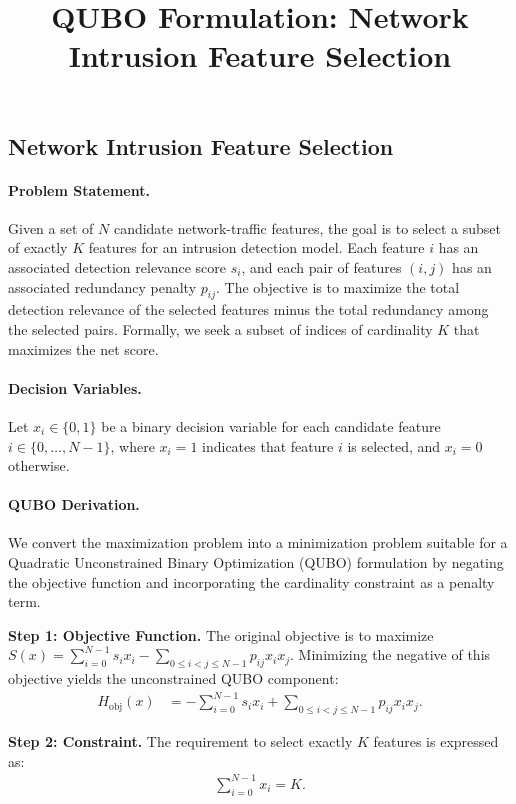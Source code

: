 \documentclass[12pt]{article}
\title{QUBO Formulation: Network Intrusion Feature Selection}
\date{}
\begin{document}
\maketitle

\subsection*{Network Intrusion Feature Selection}

\paragraph{Problem Statement.}
Given a set of $N$ candidate network-traffic features, the goal is to select a subset of exactly $K$ features for an intrusion detection model. Each feature $i$ has an associated detection relevance score $s_i$, and each pair of features $(i,j)$ has an associated redundancy penalty $p_{ij}$. The objective is to maximize the total detection relevance of the selected features minus the total redundancy among the selected pairs. Formally, we seek a subset of indices of cardinality $K$ that maximizes the net score.

\paragraph{Decision Variables.}
Let $x_i \in \{0,1\}$ be a binary decision variable for each candidate feature $i \in \{0, \dots, N-1\}$, where $x_i = 1$ indicates that feature $i$ is selected, and $x_i = 0$ otherwise.

\paragraph{QUBO Derivation.}
We convert the maximization problem into a minimization problem suitable for a Quadratic Unconstrained Binary Optimization (QUBO) formulation by negating the objective function and incorporating the cardinality constraint as a penalty term.

\textbf{Step 1: Objective Function.}
The original objective is to maximize $S(x) = \sum_{i=0}^{N-1} s_i x_i - \sum_{0 \le i < j \le N-1} p_{ij} x_i x_j$.
Minimizing the negative of this objective yields the unconstrained QUBO component:
\begin{align}
    H_{\text{obj}}(x) &= -\sum_{i=0}^{N-1} s_i x_i + \sum_{0 \le i < j \le N-1} p_{ij} x_i x_j.
\end{align}

\textbf{Step 2: Constraint.}
The requirement to select exactly $K$ features is expressed as:
\begin{align}
    \sum_{i=0}^{N-1} x_i = K.
\end{align}
\end{document}
